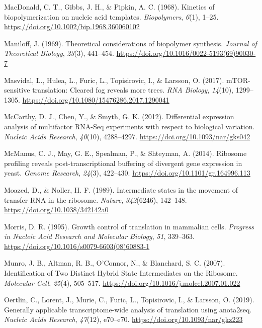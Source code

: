 \documentclass[12pt,openany]{book}
\begin{document}
\hypertarget{ref-MacDonald1968a}{}
MacDonald, C. T., Gibbs, J. H., \& Pipkin, A. C. (1968). Kinetics of
biopolymerization on nucleic acid templates. \emph{Biopolymers},
\emph{6}(1), 1--25. \url{https://doi.org/10.1002/bip.1968.360060102}

\hypertarget{ref-Maniloff1969}{}
Maniloff, J. (1969). Theoretical considerations of biopolymer synthesis.
\emph{Journal of Theoretical Biology}, \emph{23}(3), 441--454.
\url{https://doi.org/10.1016/0022-5193(69)90030-7}

\hypertarget{ref-Masvidal2017}{}
Masvidal, L., Hulea, L., Furic, L., Topisirovic, I., \& Larsson, O.
(2017). mTOR-sensitive translation: Cleared fog reveals more trees.
\emph{RNA Biology}, \emph{14}(10), 1299--1305.
\url{https://doi.org/10.1080/15476286.2017.1290041}

\hypertarget{ref-McCarthy2012}{}
McCarthy, D. J., Chen, Y., \& Smyth, G. K. (2012). Differential
expression analysis of multifactor RNA-Seq experiments with respect to
biological variation. \emph{Nucleic Acids Research}, \emph{40}(10),
4288--4297. \url{https://doi.org/10.1093/nar/gks042}

\hypertarget{ref-McManus2014}{}
McManus, C. J., May, G. E., Spealman, P., \& Shteyman, A. (2014).
Ribosome profiling reveals post-transcriptional buffering of divergent
gene expression in yeast. \emph{Genome Research}, \emph{24}(3),
422--430. \url{https://doi.org/10.1101/gr.164996.113}

\hypertarget{ref-Moazed1989}{}
Moazed, D., \& Noller, H. F. (1989). Intermediate states in the movement
of transfer RNA in the ribosome. \emph{Nature}, \emph{342}(6246),
142--148. \url{https://doi.org/10.1038/342142a0}

\hypertarget{ref-Morris1995}{}
Morris, D. R. (1995). Growth control of translation in mammalian cells.
\emph{Progress in Nucleic Acid Research and Molecular Biology},
\emph{51}, 339--363. \url{https://doi.org/10.1016/s0079-6603(08)60883-1}

\hypertarget{ref-Munro2007}{}
Munro, J. B., Altman, R. B., O'Connor, N., \& Blanchard, S. C. (2007).
Identification of Two Distinct Hybrid State Intermediates on the
Ribosome. \emph{Molecular Cell}, \emph{25}(4), 505--517.
\url{https://doi.org/10.1016/j.molcel.2007.01.022}

\hypertarget{ref-Oertlin2019}{}
Oertlin, C., Lorent, J., Murie, C., Furic, L., Topisirovic, I., \&
Larsson, O. (2019). Generally applicable transcriptome-wide analysis of
translation using anota2seq. \emph{Nucleic Acids Research},
\emph{47}(12), e70--e70. \url{https://doi.org/10.1093/nar/gkz223}
\end{document}
